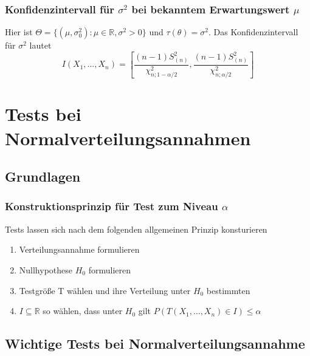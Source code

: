 \documentclass[
	ngerman,
	accentcolor=9c,%
	type=intern,
	marginpar=false
	]{tudapub}
\begin{document}
                \subsubsection*{Konfidenzintervall für $\sigma^2$ bei bekanntem Erwartungswert $\mu$}
                    Hier ist $\Theta = \{(\mu, \sigma^2_0):\mu \in \mathbb{R},\sigma^2 > 0\}$ und $\tau(\theta) = \sigma^2$. Das Konfidenzintervall für $\sigma^2$ lautet
                    \begin{equation*}
                        I(X_1,\dots,X_n)=\left[
                            \dfrac{(n-1)S^2_{(n)}}{\chi^2_{n;1-\alpha/2}}
                            ,
                            \dfrac{(n-1)S^2_{(n)}}{\chi^2_{n;\alpha/2}}
                        \right]
                    \end{equation*}
                    \newpage
        \section{Tests bei Normalverteilungsannahmen}
            \subsection{Grundlagen}
                \subsubsection*{Konstruktionsprinzip für Test zum Niveau $\alpha$}
                    Tests lassen sich nach dem folgenden allgemeinen Prinzip konsturieren
                    \begin{enumerate}
                        \item Verteilungsannahme formulieren
                        \item Nullhypothese $H_0$ formulieren
                        \item Testgröße T wählen und ihre Verteilung unter $H_0$ bestimmten
                        \item $I \subseteq \mathbb{R}$ so wählen, dass unter $H_0$ gilt $P(T(X_1,\dots,X_n)\in I) \leq \alpha$
                    \end{enumerate}
            \subsection{Wichtige Tests bei Normalverteilungsannahme}
\end{document}
